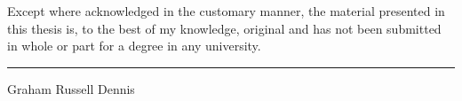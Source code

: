 \documentclass[twoside,onecolumn,11pt,a4paper,final]{book}
\begin{document}

Except where acknowledged in the customary manner, the material 
presented in this thesis is, to the best of my knowledge, original and 
has not been submitted in whole or part for a degree in any 
university.

\vspace{20mm}  %

\hspace{80mm}\rule{40mm}{.15mm}\par   %
\hspace{80mm} Graham Russell Dennis\par





\tableofcontents
\cleardoublepage

\setcounter{page}{1}  %





%








\appendix






\end{document}
